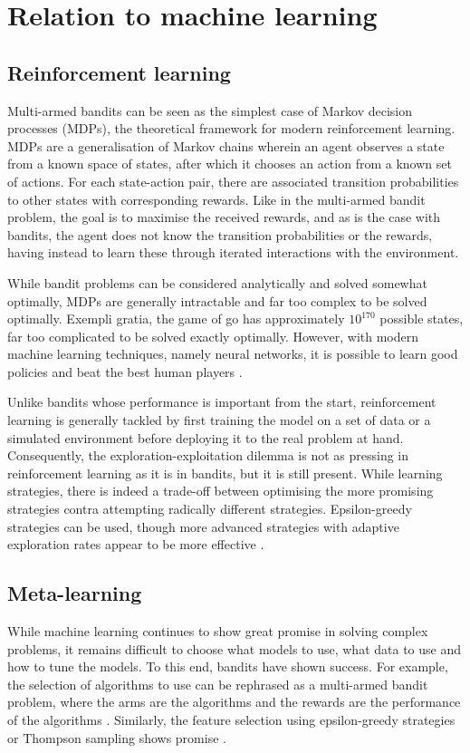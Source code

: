 \section{Relation to machine learning}
\subsection{Reinforcement learning}
Multi-armed bandits can be seen as the simplest case of Markov decision processes (MDPs), the theoretical framework for modern reinforcement learning.
MDPs are a generalisation of Markov chains wherein an agent observes a state from a known space of states, after which it chooses an action from a known set of actions.
For each state-action pair, there are associated transition probabilities to other states with corresponding rewards.
Like in the multi-armed bandit problem, the goal is to maximise the received rewards, and as is the case with bandits, the agent does not know the transition probabilities or the rewards, having instead to learn these through iterated interactions with the environment.

While bandit problems can be considered analytically and solved somewhat optimally, MDPs are generally intractable and far too complex to be solved optimally.
Exempli gratia, the game of go has approximately $10^{170}$ possible states, far too complicated to be solved exactly optimally.
However, with modern machine learning techniques, namely neural networks, it is possible to learn good policies and beat the best human players \autocite{silver2016}.

Unlike bandits whose performance is important from the start, reinforcement learning is generally tackled by first training the model on a set of data or a simulated environment before deploying it to the real problem at hand.
Consequently, the exploration-exploitation dilemma is not as pressing in reinforcement learning as it is in bandits, but it is still present.
While learning strategies, there is indeed a trade-off between optimising the more promising strategies contra attempting radically different strategies.
Epsilon-greedy strategies can be used, though more advanced strategies with adaptive exploration rates appear to be more effective \autocite{tokic2011}.


\subsection{Meta-learning}
While machine learning continues to show great promise in solving complex problems, it remains difficult to choose what models to use, what data to use and how to tune the models.
To this end, bandits have shown success.
For example, the selection of algorithms to use can be rephrased as a multi-armed bandit problem, where the arms are the algorithms and the rewards are the performance of the algorithms \autocite{gagliolo2010}.
Similarly, the feature selection using epsilon-greedy strategies \autocite{wang2014} or Thompson sampling shows promise \autocite{bouneffouf2017}.